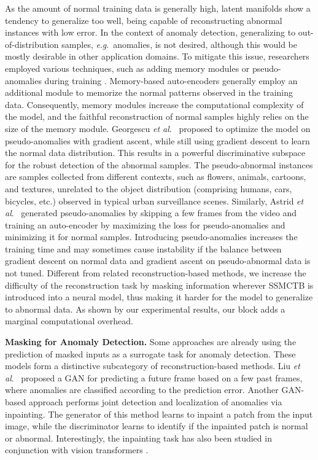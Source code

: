 \documentclass[10pt,journal,compsoc]{IEEEtran}
\newcommand{\etal}{\textit{et al}.}
\newcommand{\eg}{\textit{e}.\textit{g}.}
\begin{document}
As the amount of normal training data is generally high, latent manifolds show a tendency to generalize too well, being capable of reconstructing  abnormal instances with low error. In the context of anomaly detection, generalizing to out-of-distribution samples, \eg~anomalies, is not desired, although this would be mostly desirable in other application domains. To mitigate this issue, researchers employed various techniques, such as adding memory modules \cite{Gong-ICCV-2019,Liu-ICCV-2021,Park-CVPR-2020} or pseudo-anomalies during training \cite{Astrid-ICCVW-2021,Georgescu-TPAMI-2021}. Memory-based auto-encoders \cite{Gong-ICCV-2019,Liu-ICCV-2021} generally employ an additional module to memorize the normal patterns observed in the training data. Consequently, memory modules increase the computational complexity of the model, and the faithful reconstruction of normal samples highly relies on the size of the memory module. Georgescu \etal~\cite{Georgescu-TPAMI-2021} proposed to optimize the model on pseudo-anomalies with gradient ascent, while still using gradient descent to learn the normal data distribution. This results in a powerful discriminative subspace for the robust detection of the abnormal samples. The pseudo-abnormal instances are samples collected from different contexts, such as flowers, animals, cartoons, and textures, unrelated to the object distribution (comprising humans, cars, bicycles, etc.) observed in typical urban surveillance scenes. Similarly, Astrid \etal~\cite{Astrid-ICCVW-2021} generated pseudo-anomalies by skipping a few frames from the video and training an auto-encoder by maximizing the loss for pseudo-anomalies and minimizing it for normal samples. Introducing pseudo-anomalies increases the training time and may sometimes cause instability if the balance between gradient descent on normal data and gradient ascent on pseudo-abnormal data is not tuned. Different from related reconstruction-based methods, we increase the difficulty of the reconstruction task by masking information wherever SSMCTB is introduced into a neural model, thus making it harder for the model to generalize to abnormal data. As shown by our experimental results, our block adds a marginal computational overhead.

\noindent
\textbf{Masking for Anomaly Detection.}
Some approaches \cite{Haselmann-ICMLA-2018, Fei-TMM-2020, Jiang-TII-2023, Liu-CVPR-2018, Pirnay-ICIAP-2022, Ristea-Arxiv-2023, Yu-ACMMM-2020, Georgescu-CVPR-2021} are already using the prediction of masked inputs as a surrogate task for anomaly detection. These models form a distinctive subcategory of reconstruction-based methods.
Liu \etal~\cite{Liu-CVPR-2018} proposed a GAN for predicting a future frame based on a few past frames, where anomalies are classified according to the prediction error. Another GAN-based approach \cite{Sabokrou-ACCV-2018} performs joint detection and localization of anomalies via inpainting. The generator of this method learns to inpaint a patch from the input image, while the discriminator learns to identify if the inpainted patch is normal or abnormal. Interestingly, the inpainting task has also been studied in conjunction with vision transformers \cite{Pirnay-ICIAP-2022}.
\end{document}
